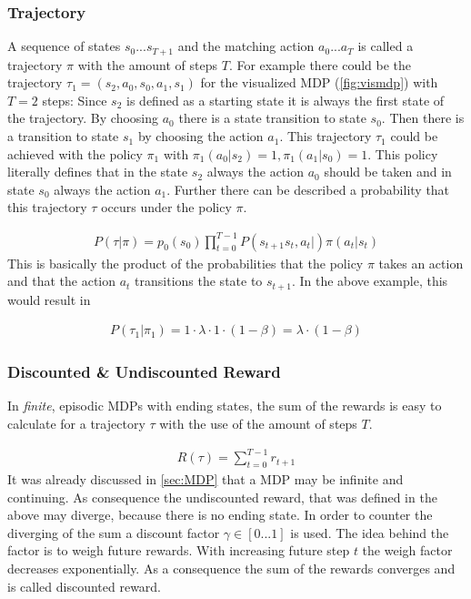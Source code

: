 \subsubsection{Trajectory}
A sequence of states $s_0 ... s_{T+1}$ and the matching action $a_0 ... a_T$ is called a trajectory $\pi$ with the amount of steps $T$.
For example there could be the trajectory $\tau_1 = (s_2, a_0, s_0, a_1, s_1)$ for the visualized MDP (\cref{fig:vismdp}) with $T=2$ steps:
Since $s_2$ is defined as a starting state it is always the first state of the trajectory. 
By choosing $a_0$ there is a state transition to state $s_0$. Then there is a transition to state $s_1$ by choosing the action $a_1$. 
This trajectory $\tau_1$ could be achieved with the policy $\pi_1$ with $\pi_1(a_0|s_2) = 1, \pi_1(a_1|s_0) = 1$. 
This policy literally defines that in the state $s_2$ always the action $a_0$ should be taken and in state $s_0$ always the action $a_1$.
Further there can be described a probability that this trajectory $\tau$ occurs under the policy $\pi$.

\begin{align}
	P(\tau| \pi) = p_0(s_0)  \prod_{t=0}^{T-1} P(s_{t+1}s_t,a_t|) \pi (a_t|s_t) 
\end{align}
\newline
This is basically the product of the probabilities that the policy $\pi$ takes an action and that the action $a_t$ transitions the state to $s_{t+1}$. 
In the above example, this would result in

\begin{align*}
	P(\tau_1|\pi_1) = 1 \cdot \lambda \cdot 1 \cdot (1-\beta) = \lambda \cdot (1-\beta)
\end{align*} 

\newpage

\subsubsection{Discounted \& Undiscounted Reward}
In \emph{finite}, episodic MDPs with ending states, the sum of the rewards is easy to calculate for a trajectory $\tau$ with the use of the amount of steps $T$.

\begin{align}
	R(\tau) = \sum_{t=0}^{T-1}r_{t+1}
\end{align}
\newline
It was already discussed in \cref{sec:MDP} that a MDP may be infinite and continuing. 
As consequence the undiscounted reward, that was defined in the above may diverge, because there is no ending state. 
In order to counter the diverging of the sum a discount factor $\gamma \in [0...1]$ is used. 
The idea behind the factor is to weigh future rewards. With increasing future step $t$ the weigh factor decreases exponentially. 
As a consequence the sum of the rewards converges and is called discounted reward.

